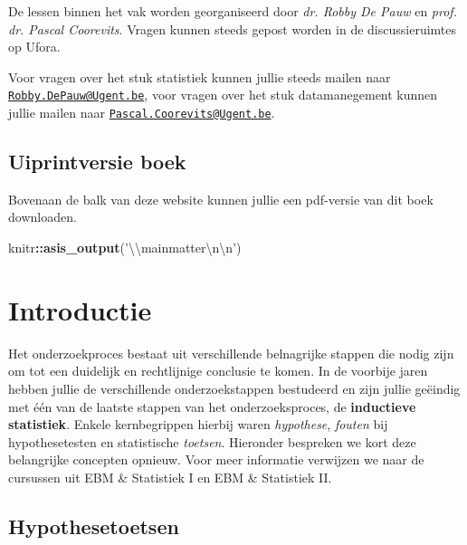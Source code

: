\documentclass[
]{book}
\newenvironment{Shaded}{\begin{snugshade}}{\end{snugshade}}
\newcommand{\CharTok}[1]{\textcolor[rgb]{0.31,0.60,0.02}{#1}}
\newcommand{\KeywordTok}[1]{\textcolor[rgb]{0.13,0.29,0.53}{\textbf{#1}}}
\newcommand{\NormalTok}[1]{#1}
\newcommand{\OperatorTok}[1]{\textcolor[rgb]{0.81,0.36,0.00}{\textbf{#1}}}
\newcommand{\StringTok}[1]{\textcolor[rgb]{0.31,0.60,0.02}{#1}}
\theoremstyle{definition}
\theoremstyle{definition}
\theoremstyle{definition}
\theoremstyle{definition}
\theoremstyle{remark}
\begin{document}
De lessen binnen het vak worden georganiseerd door \emph{dr. Robby De Pauw} en \emph{prof. dr. Pascal Coorevits}. Vragen kunnen steeds gepost worden in de discussieruimtes op Ufora.

Voor vragen over het stuk statistiek kunnen jullie steeds mailen naar \href{mailto:Robby.DePauw@Ugent.be}{\nolinkurl{Robby.DePauw@Ugent.be}}, voor vragen over het stuk datamanegement kunnen jullie mailen naar \href{mailto:Pascal.Coorevits@Ugent.be}{\nolinkurl{Pascal.Coorevits@Ugent.be}}.

\hypertarget{uiprintversie-boek}{%
\section*{Uiprintversie boek}\label{uiprintversie-boek}}


Bovenaan de balk van deze website kunnen jullie een pdf-versie van dit boek downloaden.

\begin{Shaded}
\begin{Highlighting}[]
\NormalTok{knitr}\OperatorTok{::}\KeywordTok{asis_output}\NormalTok{(}\StringTok{'}\CharTok{\textbackslash{}\textbackslash{}}\StringTok{mainmatter}\CharTok{\textbackslash{}n\textbackslash{}n}\StringTok{'}\NormalTok{)}
\end{Highlighting}
\end{Shaded}

\mainmatter

\hypertarget{intro}{%
\chapter{Introductie}\label{intro}}

Het onderzoekproces bestaat uit verschillende belnagrijke stappen die nodig zijn om tot een duidelijk en rechtlijnige conclusie te komen. In de voorbije jaren hebben jullie de verschillende onderzoekstappen bestudeerd en zijn jullie geëindig met één van de laatste stappen van het onderzoeksproces, de \textbf{inductieve statistiek}. Enkele kernbegrippen hierbij waren \emph{hypothese}, \emph{fouten} bij hypothesetesten en statistische \emph{toetsen}. Hieronder bespreken we kort deze belangrijke concepten opnieuw. Voor meer informatie verwijzen we naar de cursussen uit {EBM \& Statistiek I} en {EBM \& Statistiek II}.

\hypertarget{hypothesetoetsen}{%
\section*{Hypothesetoetsen}\label{hypothesetoetsen}}
\end{document}
